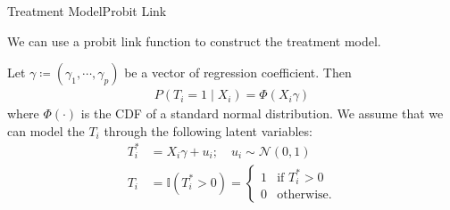 \documentclass[aspectratio=169]{beamer}					%
\begin{document}
\begin{frame}{Treatment Model}{Probit Link}


We can use a \alert{probit link} function to 
construct the treatment model. 

Let 
\alert{$\gamma\coloneqq(\gamma_1, \cdots, \gamma_p)$}
be a vector of regression coefficient. Then
\begin{align}
	P(T_i=1\mid X_i) = \Phi(X_i\gamma)
\end{align}
where $\Phi(\cdot)$ is the \alert{CDF}
of a standard normal distribution. 
We assume that we can model the $T_i$ through the following 
 latent variables:
\begin{align}
    T_i^* &= X_i\gamma +u_i; \quad u_i\sim\mathcal{N}(0,1)\\
    T_i   &= \mathbb{I}(T_i^*>0)
    =
    \begin{cases}
    1 & \text{if }T_i^*>0 \\
    0 & \text{otherwise}.
    \end{cases}
\end{align}
\end{frame}

\end{document}
